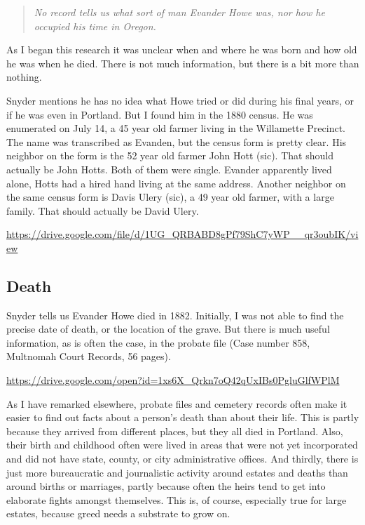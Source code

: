 \documentclass[
  12pt,
]{book}
\begin{document}
\begin{quote}
\emph{No record tells us what sort of man Evander Howe was, nor how he occupied his time in Oregon.}
\end{quote}

As I began this research it was unclear when and where he was born and how old he was when he died. There is not much information, but there is a bit more than nothing.

Snyder mentions he has no idea what Howe tried or did during his final years, or if he was even in Portland. But I found him in the 1880 census. He was enumerated on July 14, a 45 year old farmer living in the Willamette Precinct. The name was transcribed as Evanden, but the census form is pretty clear. His neighbor on the form is the 52 year old farmer John Hott (sic). That should actually be John Hotts. Both of them were single. Evander apparently lived alone, Hotts had a hired hand living at the same address. Another neighbor on the same census form is Davis Ulery (sic), a 49 year old farmer, with a large family. That should actually be David Ulery.

\url{https://drive.google.com/file/d/1UG_QRBABD8gPf79ShC7yWP__qr3oubIK/view}

\hypertarget{death}{%
\subsection{Death}\label{death}}

Snyder tells us Evander Howe died in 1882. Initially, I was not able to find the precise date of death, or the location of the grave. But there is much useful information, as is often the case, in the probate file (Case number 858, Multnomah Court Records, 56 pages).

\url{https://drive.google.com/open?id=1xs6X_Qrkn7oQ42qUxIBs0PgluGlfWPlM}

As I have remarked elsewhere, probate files and cemetery records often make it easier to find out facts about a person's death than about their life. This is partly because they arrived from different places, but they all died in Portland. Also, their birth and childhood often were lived in areas that were not yet incorporated and did not have state, county, or city administrative offices. And thirdly, there is just more bureaucratic and journalistic activity around estates and deaths than around births or marriages, partly because often the heirs tend to get into elaborate fights amongst themselves. This is, of course, especially true for large estates, because greed needs a substrate to grow on.
\end{document}

